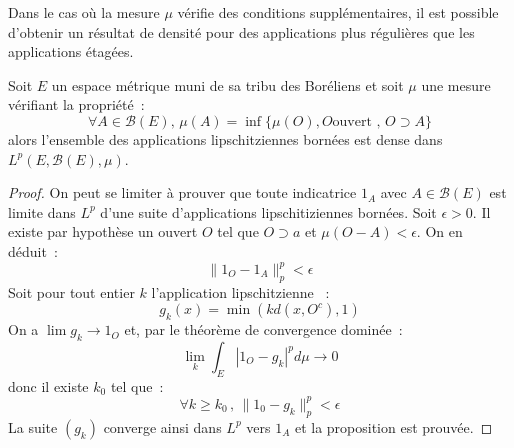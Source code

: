 Dans le cas où la mesure $\mu$ vérifie des conditions supplémentaires,
il est possible d'obtenir un résultat de densité pour des applications
plus régulières que les applications étagées.  
\begin{prop}
Soit $E$ un espace métrique muni de sa tribu des Boréliens et
  soit $\mu$ une mesure vérifiant la propriété~:
\[
\forall A \in \mathcal{B}(E), \, \mu(A) = \inf \{ \mu(O), O \mbox{
  ouvert }, \, O \supset A \}
\]
alors l'ensemble des applications lipschitziennes bornées est dense dans
$L^p(E, \mathcal{B}(E), \mu)$.
\end{prop}
\begin{proof}
On peut se limiter à prouver que toute indicatrice $1_A$ avec $A \in
\mathcal{B}(E)$  est limite dans $L^p$ d'une suite
d'applications lipschitiziennes bornées. 
Soit $\epsilon > 0$. Il existe par hypothèse un ouvert $O$ tel que $O
\supset a$ et $\mu(O-A) < \epsilon$. On en déduit~:
\[
\| 1_O - 1_A \|_p^p < \epsilon
\]
Soit pour tout entier $k$ l'application lipschitzienne ~: 
\[
g_k(x) = \min(k d(x, O^c), 1) 
\]
On a $\lim g_k \to 1_O$ et, par le théorème de convergence dominée~:
\[
\lim_k \int_E |1_O -g_k|^p d \mu \to 0
\]
donc il existe $k_0$ tel que~:
\[
\forall k \geq k_0 \, , \, \| 1_0 - g_k \|_p^p < \epsilon
\]
La suite $(g_k)$ converge ainsi dans $L^p$ vers $1_A$ et la proposition est prouvée.
\end{proof}
